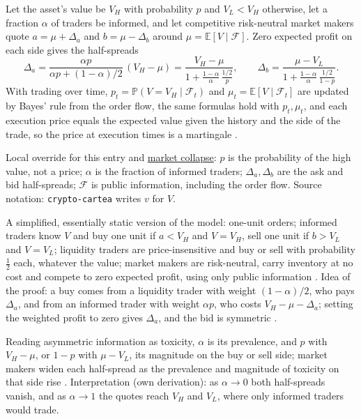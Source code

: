 \begin{qfresult}\label{res:glosten-milgrom-half-spreads}
 Let the asset's value be $V_H$ with probability $p$ and $V_L<V_H$ otherwise, let a fraction $\alpha$ of traders be informed, and let competitive risk-neutral market makers quote $a=\mu+\Delta_a$ and $b=\mu-\Delta_b$ around $\mu=\mathbb{E}[V\mid\mathcal{F}]$. Zero expected profit on each side gives the half-spreads \citep[chap.~``A Primer on the Microstructure of Financial Markets'', p.~35]{crypto-cartea}
\[ \Delta_a=\frac{\alpha p}{\alpha p+(1-\alpha)/2}\,(V_H-\mu)=\frac{V_H-\mu}{1+\frac{1-\alpha}{\alpha}\,\frac{1/2}{p}}, \qquad \Delta_b=\frac{\mu-V_L}{1+\frac{1-\alpha}{\alpha}\,\frac{1/2}{1-p}}. \]
With trading over time, $p_t=\mathbb{P}(V=V_H\mid\mathcal{F}_t)$ and $\mu_t=\mathbb{E}[V\mid\mathcal{F}_t]$ are updated by Bayes' rule from the order flow, the same formulas hold with $p_t,\mu_t$, and each execution price equals the expected value given the history and the side of the trade, so the price at execution times is a martingale \citep[same chap., p.~36]{crypto-cartea}.

 Local override for this entry and \hyperref[res:glosten-milgrom-market-collapse]{market collapse}: $p$ is the probability of the high value, not a price; $\alpha$ is the fraction of informed traders; $\Delta_a,\Delta_b$ are the ask and bid half-spreads; $\mathcal{F}$ is public information, including the order flow. Source notation: \nolinkurl{crypto-cartea} writes $v$ for $V$.

 A simplified, essentially static version of the model: one-unit orders; informed traders know $V$ and buy one unit if $a<V_H$ and $V=V_H$, sell one unit if $b>V_L$ and $V=V_L$; liquidity traders are price-insensitive and buy or sell with probability $\tfrac12$ each, whatever the value; market makers are risk-neutral, carry inventory at no cost and compete to zero expected profit, using only public information \citep[same chap., pp.~34--35]{crypto-cartea}. Idea of the proof: a buy comes from a liquidity trader with weight $(1-\alpha)/2$, who pays $\Delta_a$, and from an informed trader with weight $\alpha p$, who costs $V_H-\mu-\Delta_a$; setting the weighted profit to zero gives $\Delta_a$, and the bid is symmetric \citep[same chap., p.~35]{crypto-cartea}.

 Reading asymmetric information as toxicity, $\alpha$ is its prevalence, and $p$ with $V_H-\mu$, or $1-p$ with $\mu-V_L$, its magnitude on the buy or sell side; market makers widen each half-spread as the prevalence and magnitude of toxicity on that side rise \citep[same chap., pp.~35--36]{crypto-cartea}. Interpretation (own derivation): as $\alpha\to0$ both half-spreads vanish, and as $\alpha\to1$ the quotes reach $V_H$ and $V_L$, where only informed traders would trade.


\end{qfresult}
